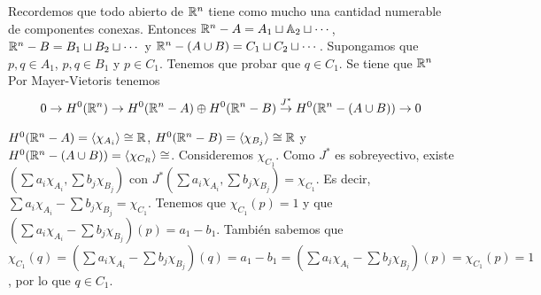 \documentclass[twoside]{article}
\begin{document}
\begin{solucion}
%
%

Recordemos que todo abierto de $\mathbb{R}^n$ tiene como mucho una cantidad numerable de componentes conexas. Entonces $\mathbb{R}^n-A=A_1\sqcup\mathbb{A}_2\sqcup\cdots$, $\mathbb{R}^n-B=B_1\sqcup B_2\sqcup\cdots$  y $\mathbb{R}^n-(A\cup B)=C_1\sqcup C_2\sqcup\cdots$. Supongamos que $p,q\in A_1$, $p,q\in B_1$ y $p\in C_1$. Tenemos que probar que $q\in C_1$. Se tiene que $\mathbb{R}^n$ Por Mayer-Vietoris tenemos
\[
0\to H^0(\mathbb{R}^n)\to H^0(\mathbb{R}^n-A)\oplus H^0(\mathbb{R}^n-B)\overset{J^*}{\to} H^0(\mathbb{R}^n-(A\cup B))\to 0
\]

$H^0(\mathbb{R}^n-A)=\langle \chi_{A_i}\rangle\cong\mathbb{R}$, $H^0(\mathbb{R}^n-B)=\langle \chi_{B_j}\rangle\cong\mathbb{R}$ y $H^0(\mathbb{R}^n-(A\cup B))=\langle \chi_{C_R}\rangle\cong$. Consideremos $\chi_{C_1}$. Como $J^*$ es sobreyectivo, existe $(\sum a_i\chi_{A_i},\sum b_j\chi_{B_j})$ con $J^*(\sum a_i\chi_{A_i},\sum b_j\chi_{B_j})=\chi_{C_1}$. Es decir, $\sum a_i\chi_{A_i}-\sum b_j\chi_{B_j}=\chi_{C_1}$. Tenemos que $\chi_{C_1}(p)=1$ y que  $(\sum a_i\chi_{A_i}-\sum b_j\chi_{B_j})(p)=a_1-b_1$. También sabemos que $\chi_{C_1}(q)=(\sum a_i\chi_{A_i}-\sum b_j\chi_{B_j})(q)=a_1-b_1=(\sum a_i\chi_{A_i}-\sum b_j\chi_{B_j})(p)=\chi_{C_1}(p)=1$, por lo que $q\in C_1$. 
\end{solucion}
\end{document}
